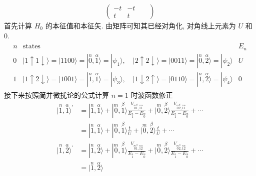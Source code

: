 \documentclass[../../main.tex]{subfiles}
\begin{document}
\begin{enumerate}
\begin{align*}
\begin{pmatrix}
            -t & -t & & \\
            t & t & &
        \end{pmatrix}
    \end{align*}
    首先计算 $H_{0}$ 的本征值和本征矢. 由矩阵可知其已经对角化, 对角线上元素为 $U$ 和 $0$. 
    \begin{align*}
        \begin{matrix}
            n & \text{states} & E_{n}\\
            0 & |1\uparrow1\downarrow\rangle = |1100\rangle = |\stackrel{n}{0},\stackrel{\alpha}{1}\rangle = |\psi_{1}\rangle, \quad|2\uparrow2\downarrow\rangle = |0011\rangle = |\stackrel{n}{0},\stackrel{\alpha}{2}\rangle = |\psi_{2}\rangle & U\\
            1 & |1\uparrow2\downarrow\rangle = |1001\rangle = |\stackrel{n}{1},\stackrel{\alpha}{1}\rangle = |\psi_{3}\rangle, \quad|1\downarrow2\uparrow\rangle = |0110\rangle = |\stackrel{n}{1},\stackrel{\alpha}{2}\rangle = |\psi_{4}\rangle & 0
        \end{matrix}
    \end{align*}
    接下来按照简并微扰论的公式计算 $n=1$ 时波函数修正
    \begin{align*}
        |\stackrel{n}{1},\stackrel{\alpha}{1}\rangle^{\prime} &= 
        |\stackrel{n}{1},\stackrel{\alpha}{1}\rangle 
        + |\stackrel{m}{0},\stackrel{\beta}{1}\rangle\frac{V_{\stackrel{m}{0}\stackrel{\beta}{1},\stackrel{n}{1}\stackrel{\alpha}{1}}}{E_{\stackrel{n}{1}}-E_{\stackrel{m}{0}}} 
        + |\stackrel{m}{0},\stackrel{\beta}{2}\rangle\frac{V_{\stackrel{m}{0}\stackrel{\beta}{2},\stackrel{n}{1}\stackrel{\alpha}{1}}}{E_{\stackrel{n}{1}}-E_{\stackrel{m}{0}}} + \cdots\\
        &= |\stackrel{n}{1},\stackrel{\alpha}{1}\rangle 
        + |\stackrel{m}{0},\stackrel{\beta}{1}\rangle\frac{t}{U}
        + |\stackrel{m}{0},\stackrel{\beta}{2}\rangle\frac{t}{U} + \cdots\\
        |\stackrel{n}{1},\stackrel{\alpha}{2}\rangle^{\prime} &= 
        |\stackrel{n}{1},\stackrel{\alpha}{2}\rangle
        + |\stackrel{m}{0},\stackrel{\beta}{1}\rangle\frac{V_{\stackrel{m}{0}\stackrel{\beta}{1},\stackrel{n}{1}\stackrel{\alpha}{2}}}{E_{\stackrel{n}{1}}-E_{\stackrel{m}{0}}}
        + |\stackrel{m}{0},\stackrel{\beta}{2}\rangle\frac{V_{\stackrel{m}{0}\stackrel{\beta}{2},\stackrel{n}{1}\stackrel{\alpha}{2}}}{E_{\stackrel{n}{1}}-E_{\stackrel{m}{0}}} + \cdots\\
        &= |\stackrel{n}{1},\stackrel{\alpha}{2}\rangle

\end{align*}
\end{enumerate}
\end{document}
